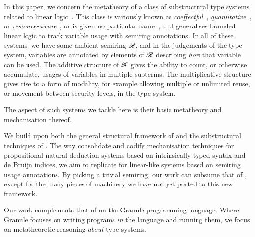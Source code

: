 
In this paper, we concern the metatheory of a class of substructural type
systems related to linear logic~\cite{girard87linear}.
This class is variously known as
\emph{coeffectful}~\cite{PetricekOM14,Granule18},
\emph{quantitative}~\cite{BrunelGMZ14,Atkey18}, or
\emph{resource-aware}~\cite{GhicaS14},
or is given no particular name~\cite{reed10distance,abadi99core},
and generalises bounded linear logic to track variable usage with semiring
annotations.
In all of these systems, we have some ambient semiring $\mathscr R$, and in the
judgements of the type system, variables are annotated by elements of $\mathscr R$
describing \emph{how} that variable can be used.
The additive structure of $\mathscr R$ gives the ability to count, or otherwise
accumulate, usages of variables in multiple subterms.
The multiplicative structure gives rise to a form of modality, for example
allowing multiple or unlimited reuse, or movement between security levels, in
the type system.

The aspect of such systems we tackle here is their basic metatheory and
mechanisation thereof.

We build upon both the general structural framework of
\citet{AACMM20} and the substructural techniques of \citet{WA20}.
The way \citeauthor{AACMM20} consolidate and codify mechanisation techniques for
propositional natural deduction systems based on intrinsically typed syntax and
de Bruijn indices, we aim to replicate for linear-like systems based on
semiring usage annotations.
By picking a trivial semiring, our work can subsume that of
\citeauthor{AACMM20}, except for the many pieces of machinery we have not yet
ported to this new framework.

Our work complements that of \citet{Granule18} on the Granule programming
language.
Where Granule focuses on writing programs \emph{in} the language and running
them, we focus on metatheoretic reasoning \emph{about} type systems.

